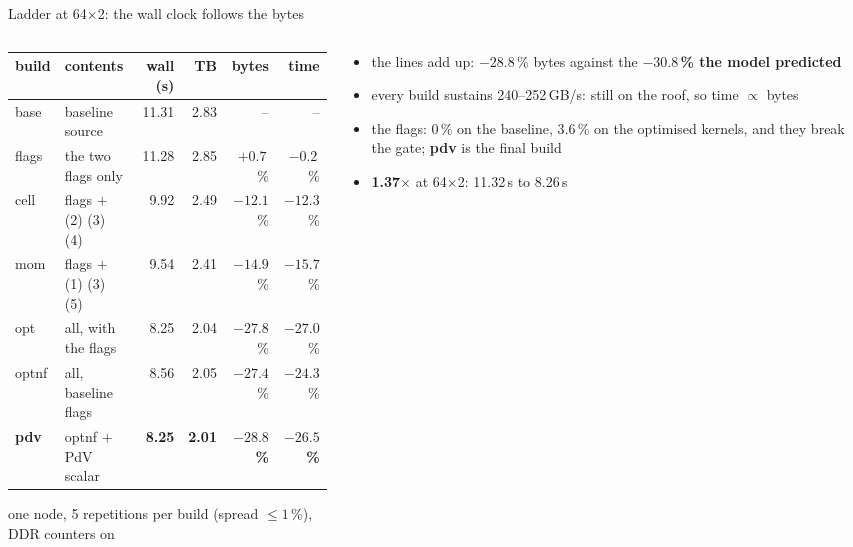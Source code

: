 \documentclass[aspectratio=169,10pt]{beamer}
\newcommand{\GBs}{\,GB/s}
\newcommand{\good}[1]{\textcolor{rugred}{\textbf{#1}}}
\begin{document}
\begin{frame}{Ladder at 64$\times$2: the wall clock follows the bytes}
  \begin{columns}[T]
    \begin{column}{0.67\textwidth}
      \footnotesize\setlength{\tabcolsep}{4pt}
      \begin{tabular}{llrrrr}
        \toprule
        build & contents & wall (s) & TB & bytes & time \\
        \midrule
        base  & baseline source                    & 11.31 & 2.83 & -- & -- \\
        flags & the two flags only                 & 11.28 & 2.85 & $+0.7$\,\% & $-0.2$\,\% \\
        cell  & flags $+$ (2) (3) (4)              &  9.92 & 2.49 & $-12.1$\,\% & $-12.3$\,\% \\
        mom   & flags $+$ (1) (3) (5)              &  9.54 & 2.41 & $-14.9$\,\% & $-15.7$\,\% \\
        opt   & all, with the flags                & 8.25 & 2.04 & $-27.8$\,\% & $-27.0$\,\% \\
        optnf & all, baseline flags                & 8.56 & 2.05 & $-27.4$\,\% & $-24.3$\,\% \\
        \textbf{pdv} & optnf $+$ PdV scalar & \textbf{8.25} & \textbf{2.01} & \good{$-28.8$\,\%} & \good{$-26.5$\,\%} \\
        \bottomrule
      \end{tabular}
      \par\vspace{0.1cm}
      \scriptsize one node, 5 repetitions per build (spread $\le 1$\,\%), DDR counters on
    \end{column}
    \begin{column}{0.33\textwidth}
      \begin{itemize}
        \item the lines add up: $-28.8$\,\% bytes against the \textbf{$-30.8$\,\% the model predicted}
        \item every build sustains 240--252\GBs: still on the roof, so time $\propto$ bytes
        \item the flags: 0\,\% on the baseline, 3.6\,\% on the optimised kernels, and they break the gate; \textbf{pdv} is the final build
        \item \good{1.37$\times$} at 64$\times$2: 11.32\,s to 8.26\,s
      \end{itemize}
    \end{column}
  \end{columns}
\end{frame}
\end{document}
